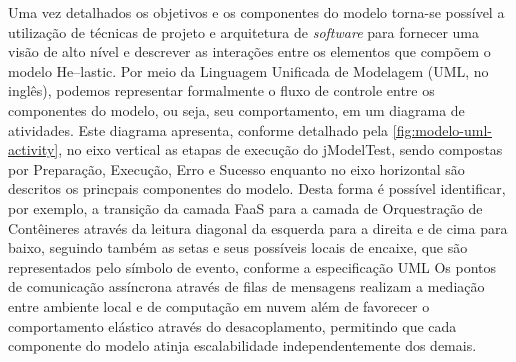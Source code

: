\documentclass[english,brazilian]{UNISINOSmonografia} %
\begin{document}
Uma vez detalhados os objetivos e os componentes do modelo torna-se possível a utilização de técnicas de projeto e arquitetura de \textit{software} para fornecer uma visão de alto nível e descrever as interações entre os elementos que compõem o modelo \textsf{He}--lastic.
Por meio da Linguagem Unificada de Modelagem (UML, no inglês), podemos representar formalmente o fluxo de controle entre os componentes do modelo, ou seja, seu comportamento, em um diagrama de atividades.
%
Este diagrama apresenta, conforme detalhado pela \autoref{fig:modelo-uml-activity}, no eixo vertical as etapas de execução do jModelTest, sendo compostas por { Preparação,  Execução, Erro e Sucesso} enquanto no eixo horizontal são descritos os princpais componentes do modelo.
%
Desta forma é possível identificar, por exemplo, a transição da camada FaaS para a camada de Orquestração de Contêineres através da leitura diagonal da esquerda para a direita e de cima para baixo, seguindo também as setas e seus possíveis locais de encaixe, que são representados pelo símbolo de evento, conforme a especificação UML
%
Os pontos de comunicação assíncrona através de filas de mensagens realizam a mediação entre ambiente local e de computação em nuvem além de favorecer o comportamento elástico através do desacoplamento, permitindo que cada componente do modelo atinja escalabilidade independentemente dos demais.
\end{document}

